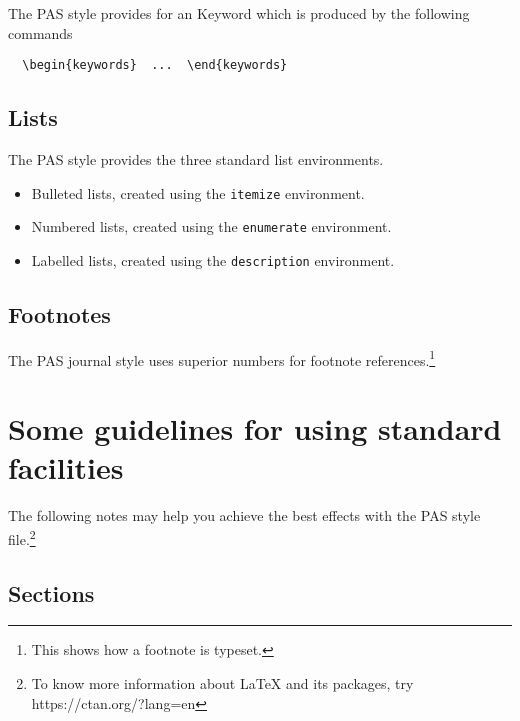 \documentclass{pas}
\begin{document}
The PAS style provides for an Keyword which is produced by the following
commands
%
\begin{verbatim}
  \begin{keywords}  ...  \end{keywords}
\end{verbatim}


\subsection{Lists}

The PAS style provides the three standard list environments.
\begin{itemize}
  \item Bulleted lists, created using the \verb"itemize" environment.
  \item Numbered lists, created using the \verb"enumerate" environment.
  \item Labelled lists, created using the \verb"description" environment.
\end{itemize}

\subsection{Footnotes}

The PAS journal style uses superior numbers for footnote
references.\footnote{This shows how a footnote is typeset.}

\section{Some guidelines for using standard facilities}

The following notes may help you achieve the best effects with the PAS style
file.\footnote{To know more information about LaTeX and its packages, try https://ctan.org/?lang=en}

\subsection{Sections}
\end{document}
